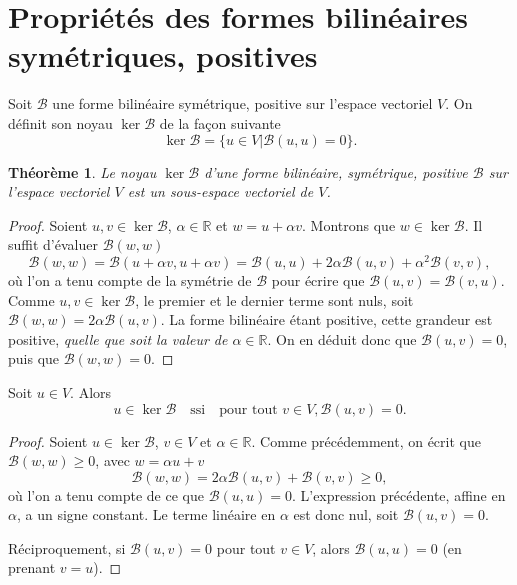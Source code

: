 \documentclass[12pt, final]{amsart}
\newtheorem{theorem}{Théorème}
\newcommand{\reals}{\mathbb{R}}
\begin{document}
\appendix

\section{Propriétés des formes bilinéaires symétriques, positives}

Soit \(\mathcal B\) une forme bilinéaire symétrique, positive sur l'espace vectoriel
\(V\). On définit son noyau \(\ker\mathcal B\) de la façon suivante
\begin{equation}
  \ker\mathcal B=\{u\in V|\mathcal B(u, u)=0\}.
\end{equation}

\begin{theorem}
  Le noyau \(\ker\mathcal B\) d'une forme bilinéaire, symétrique, positive
  \(\mathcal B\) sur l'espace vectoriel \(V\) est un sous-espace vectoriel de
  \(V\).
\end{theorem}
\begin{proof}
  Soient \(u, v\in\ker\mathcal B\), \(\alpha\in\reals\) et \(w=u+\alpha
  v\). Montrons que \(w\in\ker\mathcal B\). Il suffit d'évaluer
  \(\mathcal B(w, w)\)
  \begin{equation}
    \mathcal B(w, w)=\mathcal B(u+\alpha v, u+\alpha v)=\mathcal B(u, u)+2\alpha\mathcal B(u, v)+\alpha^2\mathcal B(v, v),
  \end{equation}
  où l'on a tenu compte de la symétrie de \(\mathcal B\) pour écrire que
  \(\mathcal B(u, v)=\mathcal B(v, u)\). Comme \(u, v\in\ker\mathcal B\), le
  premier et le dernier terme sont nuls, soit
  \(\mathcal B(w, w)=2\alpha\mathcal B(u, v)\). La forme bilinéaire étant
  positive, cette grandeur est positive, \emph{quelle que soit la valeur de
    \(\alpha\in\reals\)}. On en déduit donc que \(\mathcal B(u, v)=0\), puis
  que \(\mathcal B(w, w)=0\).
\end{proof}

Soit \(u\in V\). Alors
\begin{equation}
  u\in\ker\mathcal B\quad\text{ssi}\quad\text{pour tout }v\in V, \mathcal B(u, v)=0.
\end{equation}
\begin{proof}
  Soient \(u\in\ker\mathcal B\), \(v\in V\) et \(\alpha\in\reals\). Comme
  précédemment, on écrit que \(\mathcal B(w, w)≥0\), avec \(w=\alpha u+v\)
  \begin{equation}
    \mathcal B(w, w)=2\alpha\mathcal B(u, v)+\mathcal B(v, v)≥0,
  \end{equation}
  où l'on a tenu compte de ce que \(\mathcal B(u, u)=0\). L'expression
  précédente, affine en \(\alpha\), a un signe constant. Le terme linéaire en
  \(\alpha\) est donc nul, soit \(\mathcal B(u, v)=0\).

  Réciproquement, si \(\mathcal B(u, v)=0\) pour tout \(v\in V\), alors
  \(\mathcal B(u, u)=0\) (en prenant \(v=u\)).
\end{proof}
\end{document}
